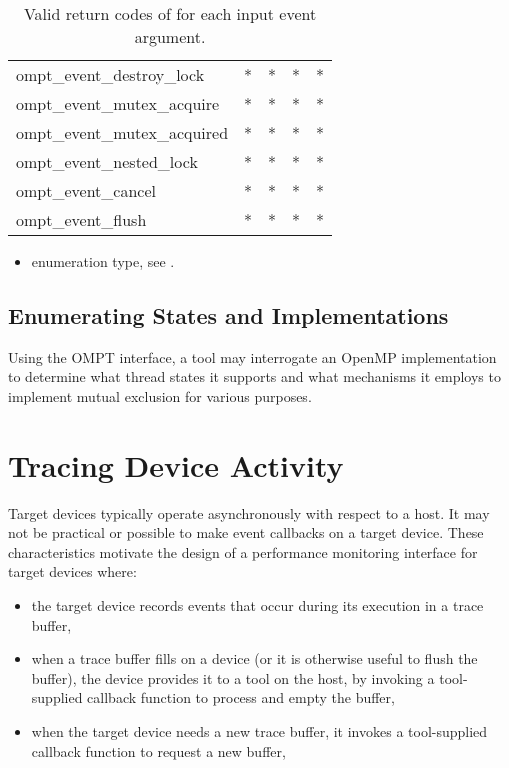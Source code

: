 \begin{table}
\begin{tabular}{lp{3em}p{3em}p{3em}p{3em}}
ompt\_event\_destroy\_lock          & * & * & * & * \\
ompt\_event\_mutex\_acquire         & * & * & * & * \\
ompt\_event\_mutex\_acquired        & * & * & * & * \\
ompt\_event\_nested\_lock           & * & * & * & * \\
ompt\_event\_cancel           & * & * & * & * \\
ompt\_event\_flush                  & * & * & * & * \\
\bottomrule
\end{tabular}
\caption{Valid return codes of  for each input event argument.}
\label{table:valid_rc}
\end{table}

\crossreferences
\begin{itemize}
\item {} enumeration type, see
.
\end{itemize}

\clearpage

\subsection{Enumerating States and Implementations}
Using the OMPT interface, a tool may interrogate an OpenMP implementation to 
determine what thread states it supports and what mechanisms it employs to 
implement mutual exclusion for various purposes.

\section{Tracing Device Activity}
\label{sec:tracing-device-activity}

Target devices typically operate asynchronously with respect to a
host. It may not be practical or possible to make event callbacks
on a target device. These characteristics motivate the design of a
performance monitoring interface for target devices where:

\begin{itemize}
\item the target device records events that occur during its execution in a trace buffer,
\item when a trace buffer fills on a device (or it is otherwise useful to flush the buffer),  the device provides it to a tool on the host, by invoking a tool-supplied callback function to process and empty the buffer,
\item when the target device needs a new trace buffer, it invokes a tool-supplied callback function to request a new buffer,
\end{itemize}


